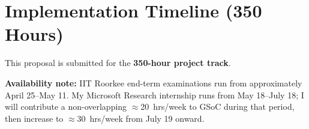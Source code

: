 \documentclass[11pt,a4paper]{article}
\begin{document}
\vspace{6pt}

\section{Implementation Timeline (350 Hours)}

This proposal is submitted for the \textbf{350-hour project track}.

\begin{metricbox}
\small\textbf{Availability note:} IIT Roorkee end-term examinations run from approximately April 25--May 11. My Microsoft Research internship runs from May 18--July 18; I will contribute a non-overlapping $\approx$20~hrs/week to GSoC during that period, then increase to $\approx$30~hrs/week from July 19 onward.
\end{metricbox}

\vspace{6pt}
\end{document}
